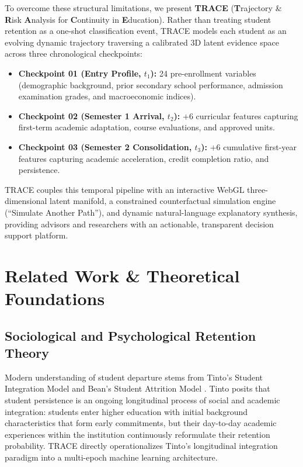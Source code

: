 \documentclass[conference]{IEEEtran}
\begin{document}
To overcome these structural limitations, we present \textbf{TRACE} (\textbf{T}rajectory \& \textbf{R}isk \textbf{A}nalysis for \textbf{C}ontinuity in \textbf{E}ducation). Rather than treating student retention as a one-shot classification event, TRACE models each student as an evolving dynamic trajectory traversing a calibrated 3D latent evidence space across three chronological checkpoints:
\begin{itemize}
    \item \textbf{Checkpoint 01 (Entry Profile, $t_1$):} 24 pre-enrollment variables (demographic background, prior secondary school performance, admission examination grades, and macroeconomic indices).
    \item \textbf{Checkpoint 02 (Semester 1 Arrival, $t_2$):} $+6$ curricular features capturing first-term academic adaptation, course evaluations, and approved units.
    \item \textbf{Checkpoint 03 (Semester 2 Consolidation, $t_3$):} $+6$ cumulative first-year features capturing academic acceleration, credit completion ratio, and persistence.
\end{itemize}

TRACE couples this temporal pipeline with an interactive WebGL three-dimensional latent manifold, a constrained counterfactual simulation engine (``Simulate Another Path''), and dynamic natural-language explanatory synthesis, providing advisors and researchers with an actionable, transparent decision support platform.

\section{Related Work \& Theoretical Foundations}

\subsection{Sociological and Psychological Retention Theory}
Modern understanding of student departure stems from Tinto's Student Integration Model \cite{tinto1975dropout} and Bean's Student Attrition Model \cite{bean1980dropouts}. Tinto posits that student persistence is an ongoing longitudinal process of social and academic integration: students enter higher education with initial background characteristics that form early commitments, but their day-to-day academic experiences within the institution continuously reformulate their retention probability. TRACE directly operationalizes Tinto's longitudinal integration paradigm into a multi-epoch machine learning architecture.
\end{document}
